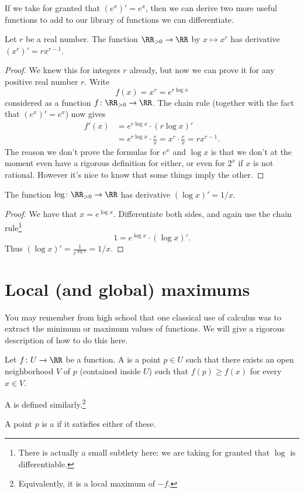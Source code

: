 If we take for granted that $(e^x)' = e^x$,
then we can derive two more useful functions
to add to our library of functions we can differentiate.
\begin{corollary}
	Let $r$ be a real number.
	The function $\RR_{>0} \to \RR$ by $x \mapsto x^r$
	has derivative $(x^r)' = rx^{r-1}$.
\end{corollary}

\begin{proof}
	We knew this for integers $r$ already,
	but now we can prove it for any positive real number $r$.
	Write
	\[ f(x) = x^r = e^{r \log x} \]
	considered as a function $f \colon \RR_{>0} \to \RR$.
	The chain rule (together with the fact that $(e^x)' = e^x$)
	now gives
	\begin{align*}
		f'(x) &= e^{r \log x} \cdot (r \log x)' \\
		&= e^{r \log x} \cdot \frac rx = x^r \cdot \frac rx = rx^{r-1}.
	\end{align*}
	The reason we don't prove the formulas for $e^x$ and $\log x$
	is that we don't at the moment even have a rigorous
	definition for either, or even for $2^x$ if $x$ is not rational.
	However it's nice to know that some things imply the other.
\end{proof}
\begin{corollary}
	The function $\log \colon \RR_{>0} \to \RR$
	has derivative $(\log x)' = 1/x$.
\end{corollary}
\begin{proof}
	We have that $x = e^{\log x}$.
	Differentiate both sides, and again use the chain rule\footnote{There
		is actually a small subtlety here:
		we are taking for granted that $\log$ is differentiable.}
	\[ 1 = e^{\log x} \cdot (\log x)'. \]
	Thus $(\log x)' = \frac{1}{e^{\log x}} = 1/x$.
\end{proof}

\section{Local (and global) maximums}
You may remember from high school
that one classical use of calculus
was to extract the minimum or maximum values of functions.
We will give a rigorous description of how to do this here.

\begin{definition}
	Let $f \colon U \to \RR$ be a function.
	A  is a point $p \in U$
	such that there exists an open neighborhood $V$ of $p$ (contained inside $U$)
	such that $f(p) \ge f(x)$ for every $x \in V$.

	A  is defined similarly.\footnote{Equivalently,
		it is a local maximum of $-f$.}
\end{definition}
\begin{definition}
	A point $p$ is a 
	if it satisfies either of these.
\end{definition}

